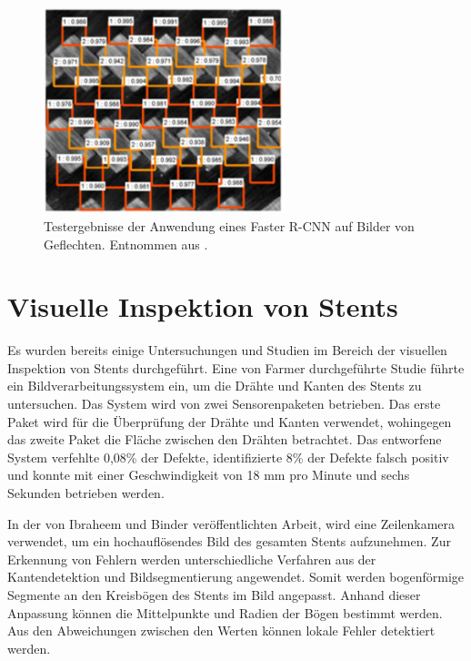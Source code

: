 \begin{figure}[h!]
\centering
\includegraphics[width=7cm]{98_images/xiao_2020.png}
\caption{Testergebnisse der Anwendung eines Faster R-CNN auf Bilder von Geflechten. Entnommen aus \cite{xiao2020surface}.}
\label{fig:faster_rcnn}
\end{figure}


\section{Visuelle Inspektion von Stents}
Es wurden bereits einige Untersuchungen und Studien im Bereich der visuellen Inspektion von Stents durchgeführt. Eine von Farmer \cite{farmer2005automated} durchgeführte Studie führte ein Bildverarbeitungssystem ein, um die Drähte und Kanten des Stents zu untersuchen. Das System wird von zwei Sensorenpaketen betrieben. Das erste Paket wird für die Überprüfung der Drähte und Kanten verwendet, wohingegen das zweite Paket die Fläche zwischen den Drähten betrachtet. Das entworfene System verfehlte 0,08{\%} der Defekte, identifizierte 8{\%} der Defekte falsch positiv und konnte mit einer Geschwindigkeit von 18 mm pro Minute und sechs Sekunden betrieben werden. \cite{farmer2005automated}

\mypar In der von Ibraheem und Binder \cite{ibraheem2009automated} veröffentlichten Arbeit, wird eine Zeilenkamera verwendet, um ein hochauflösendes Bild des gesamten Stents aufzunehmen. Zur Erkennung von Fehlern werden unterschiedliche Verfahren aus der Kantendetektion und Bildsegmentierung angewendet. Somit werden bogenförmige Segmente an den Kreisbögen des Stents im Bild angepasst. Anhand dieser Anpassung können die Mittelpunkte und Radien der Bögen bestimmt werden. Aus den Abweichungen zwischen den Werten können lokale Fehler detektiert werden. \cite{ibraheem2009automated}

